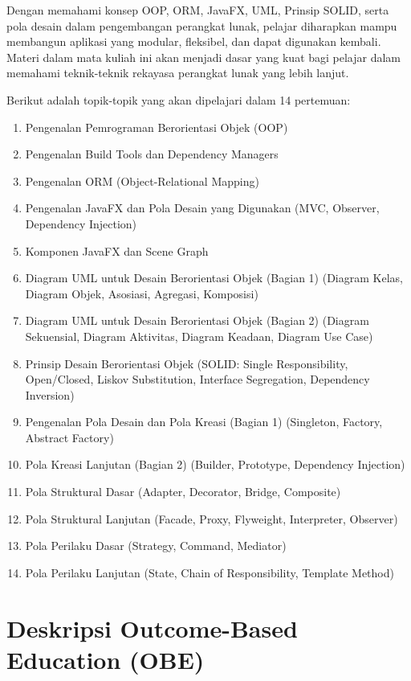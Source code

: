 Dengan memahami konsep OOP, ORM, JavaFX, UML, Prinsip SOLID, serta pola desain dalam pengembangan perangkat lunak, pelajar diharapkan mampu membangun aplikasi yang modular, fleksibel, dan dapat digunakan kembali. Materi dalam mata kuliah ini akan menjadi dasar yang kuat bagi pelajar dalam memahami teknik-teknik rekayasa perangkat lunak yang lebih lanjut. 

Berikut adalah topik-topik yang akan dipelajari dalam 14 pertemuan:

\begin{enumerate}
	\item Pengenalan Pemrograman Berorientasi Objek (OOP)
	\item Pengenalan Build Tools dan Dependency Managers
	\item Pengenalan ORM (Object-Relational Mapping)
	\item Pengenalan JavaFX dan Pola Desain yang Digunakan (MVC, Observer, Dependency Injection)
	\item Komponen JavaFX dan Scene Graph
	\item Diagram UML untuk Desain Berorientasi Objek (Bagian 1) (Diagram Kelas, Diagram Objek, Asosiasi, Agregasi, Komposisi)
	\item Diagram UML untuk Desain Berorientasi Objek (Bagian 2) (Diagram Sekuensial, Diagram Aktivitas, Diagram Keadaan, Diagram Use Case)
	\item Prinsip Desain Berorientasi Objek (SOLID: Single Responsibility, Open/Closed, Liskov Substitution, Interface Segregation, Dependency Inversion)
	\item Pengenalan Pola Desain dan Pola Kreasi (Bagian 1) (Singleton, Factory, Abstract Factory)
	\item Pola Kreasi Lanjutan (Bagian 2) (Builder, Prototype, Dependency Injection)
	\item Pola Struktural Dasar (Adapter, Decorator, Bridge, Composite)
	\item Pola Struktural Lanjutan (Facade, Proxy, Flyweight, Interpreter, Observer)
	\item Pola Perilaku Dasar (Strategy, Command, Mediator)
	\item Pola Perilaku Lanjutan (State, Chain of Responsibility, Template Method)
\end{enumerate}


\section{Deskripsi Outcome-Based Education (OBE)}

